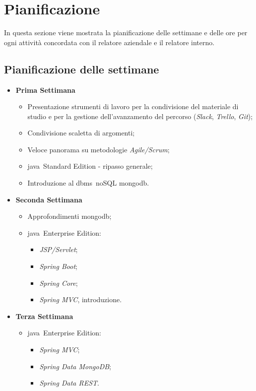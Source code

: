 
\section{Pianificazione}

In questa sezione viene mostrata la pianificazione delle settimane e delle ore per ogni attività concordata con il relatore aziendale e il relatore interno.

\subsection{Pianificazione delle settimane}

\begin{itemize}
	\item \textbf{Prima Settimana}
	\begin{itemize}
		\item Presentazione strumenti di lavoro per la condivisione del materiale di studio e per la gestione
		dell'avanzamento del percorso (\textit{Slack}, \textit{Trello}, \textit{Git});
		\item Condivisione scaletta di argomenti;
		\item Veloce panorama su metodologie \textit{Agile/Scrum}; %
		\item \gls{java}\gloss\ Standard Edition - ripasso generale; %
		\item Introduzione al \gls{dbms}\gloss\ noSQL \gls{mongodb}\gloss. %
	\end{itemize}

	\item \textbf{Seconda Settimana}
	\begin{itemize}
		\item Approfondimenti \gls{mongodb}\gloss; %
		\item \gls{java}\gloss\ Enterprise Edition:
		\begin{itemize}
			\item \textit{JSP/Servlet}; %
			\item \textit{Spring Boot}; %
			\item \textit{Spring Core}; %
			\item \textit{Spring MVC}, introduzione. %
		\end{itemize}
	\end{itemize}

	\item \textbf{Terza Settimana}
	\begin{itemize}
		\item \gls{java}\gloss\ Enterprise Edition:
		\begin{itemize}
			\item \textit{Spring MVC}; %
			\item \textit{Spring Data MongoDB}; %
			\item \textit{Spring Data REST}. %
		\end{itemize}
	\end{itemize}


\end{itemize}
